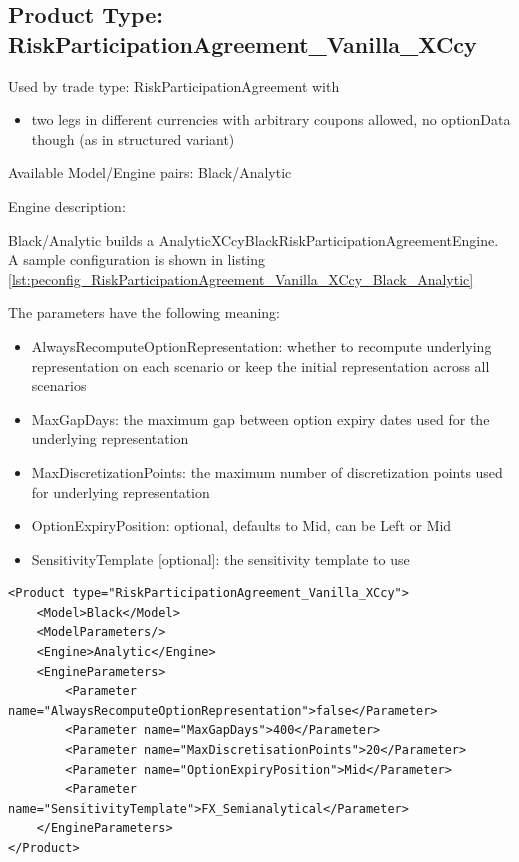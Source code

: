 \subsection{Product Type: RiskParticipationAgreement\_Vanilla\_XCcy}

Used by trade type: RiskParticipationAgreement with

\begin{itemize}
\item two legs in different currencies with arbitrary coupons allowed, no
  optionData though (as in structured variant)
\end{itemize}

Available Model/Engine pairs: Black/Analytic

Engine description:

Black/Analytic builds a AnalyticXCcyBlackRiskParticipationAgreementEngine. A sample configuration is shown in listing
\ref{lst:peconfig_RiskParticipationAgreement_Vanilla_XCcy_Black_Analytic}

The parameters have the following meaning:

\begin{itemize}
\item AlwaysRecomputeOptionRepresentation: whether to recompute underlying representation on each scenario or keep the initial representation across all scenarios
\item MaxGapDays: the maximum gap between option expiry dates used for the underlying representation
\item MaxDiscretizationPoints: the maximum number of discretization points used for underlying representation
\item OptionExpiryPosition: optional, defaults to Mid, can be Left or Mid
\item SensitivityTemplate [optional]: the sensitivity template to use
\end{itemize}

\begin{longlisting}
\begin{verbatim}
<Product type="RiskParticipationAgreement_Vanilla_XCcy">
    <Model>Black</Model>
    <ModelParameters/>
    <Engine>Analytic</Engine>
    <EngineParameters>
        <Parameter name="AlwaysRecomputeOptionRepresentation">false</Parameter>
        <Parameter name="MaxGapDays">400</Parameter>
        <Parameter name="MaxDiscretisationPoints">20</Parameter>
        <Parameter name="OptionExpiryPosition">Mid</Parameter>
        <Parameter name="SensitivityTemplate">FX_Semianalytical</Parameter>
    </EngineParameters>
</Product>
\end{verbatim}
\caption{Configuration for Product RiskParticipationAgreement\_Vanilla\_XCcy, Model Black, Engine Analytic}
\label{lst:peconfig_RiskParticipationAgreement_Vanilla_XCcy_Black_Analytic}
\end{longlisting}

